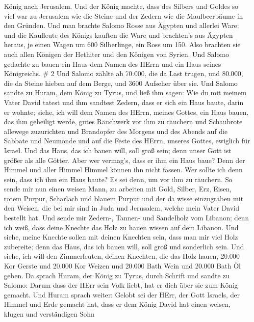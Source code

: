 König nach Jerusalem.  Und der König machte, dass des
Silbers und Goldes so viel war zu Jerusalem wie die Steine und der
Zedern wie die Maulbeerbäume in den Gründen.  Und man
brachte Salomo Rosse aus Ägypten und allerlei Ware; und die Kaufleute
des Königs kauften die Ware  und brachten's aus Ägypten
heraus, je einen Wagen um 600 Silberlinge, ein Ross um 150. Also
brachten sie auch allen Königen der Hethiter und den Königen von Syrien.
 Und Salomo gedachte zu bauen ein Haus dem Namen des HErrn
und ein Haus seines Königreichs. \# 2  Und Salomo zählte ab
70.000, die da Last trugen, und 80.000, die da Steine hieben auf dem
Berge, und 3600 Aufseher über sie.  Und Salomo sandte zu
Huram, dem König zu Tyrus, und ließ ihm sagen: Wie du mit meinem Vater
David tatest und ihm sandtest Zedern, dass er sich ein Haus baute, darin
er wohnte;  siehe, ich will dem Namen des HErrn, meines
Gottes, ein Haus bauen, das ihm geheiligt werde, gutes Räuchwerk vor ihm
zu räuchern und Schaubrote allewege zuzurichten und Brandopfer des
Morgens und des Abends auf die Sabbate und Neumonde und auf die Feste
des HErrn, unseres Gottes, ewiglich für Israel.  Und das
Haus, das ich bauen will, soll groß sein; denn unser Gott ist größer als
alle Götter.  Aber wer vermag's, dass er ihm ein Haus baue?
Denn der Himmel und aller Himmel Himmel können ihn nicht fassen. Wer
sollte ich denn sein, dass ich ihm ein Haus baute? Es sei denn, um vor
ihm zu räuchern.  So sende mir nun einen weisen Mann, zu
arbeiten mit Gold, Silber, Erz, Eisen, rotem Purpur, Scharlach und
blauem Purpur und der da wisse einzugraben mit den Weisen, die bei mir
sind in Juda und Jerusalem, welche mein Vater David bestellt hat.
 Und sende mir Zedern-, Tannen- und Sandelholz vom Libanon;
denn ich weiß, dass deine Knechte das Holz zu hauen wissen auf dem
Libanon. Und siehe, meine Knechte sollen mit deinen Knechten sein,
 dass man mir viel Holz zubereite; denn das Haus, das ich
bauen will, soll groß und sonderlich sein.  Und siehe, ich
will den Zimmerleuten, deinen Knechten, die das Holz hauen, 20.000 Kor
Gerste und 20.000 Kor Weizen und 20.000 Bath Wein und 20.000 Bath Öl
geben.  Da sprach Huram, der König zu Tyrus, durch Schrift
und sandte zu Salomo: Darum dass der HErr sein Volk liebt, hat er dich
über sie zum König gemacht.  Und Huram sprach weiter:
Gelobt sei der HErr, der Gott Israels, der Himmel und Erde gemacht hat,
dass er dem König David hat einen weisen, klugen und verständigen Sohn
